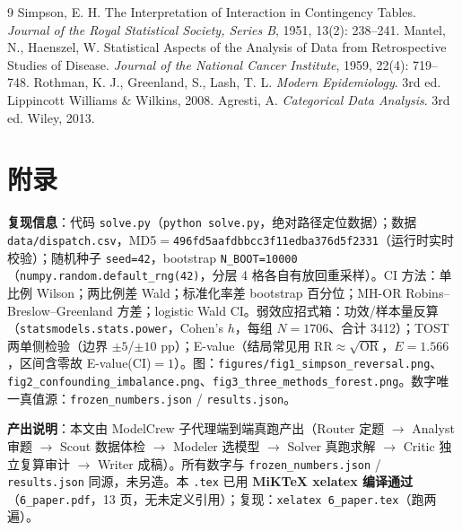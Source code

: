 \documentclass[12pt,a4paper]{ctexart}
\begin{document}
\begin{thebibliography}{9}
 Simpson, E. H. The Interpretation of Interaction in Contingency Tables. \textit{Journal of the Royal Statistical Society, Series B}, 1951, 13(2): 238--241.
 Mantel, N., Haenszel, W. Statistical Aspects of the Analysis of Data from Retrospective Studies of Disease. \textit{Journal of the National Cancer Institute}, 1959, 22(4): 719--748.
 Rothman, K. J., Greenland, S., Lash, T. L. \textit{Modern Epidemiology}. 3rd ed. Lippincott Williams \& Wilkins, 2008.
 Agresti, A. \textit{Categorical Data Analysis}. 3rd ed. Wiley, 2013.
\end{thebibliography}

\appendix
\section{附录}
\textbf{复现信息}：代码 \texttt{solve.py}（\texttt{python solve.py}，绝对路径定位数据）；数据 \texttt{data/dispatch.csv}，MD5$=$\texttt{496fd5aafdbbcc3f11edba376d5f2331}（运行时实时校验）；随机种子 \texttt{seed=42}，bootstrap \texttt{N\_BOOT=10000}（\texttt{numpy.random.default\_rng(42)}，分层 4 格各自有放回重采样）。CI 方法：单比例 Wilson；两比例差 Wald；标准化率差 bootstrap 百分位；MH-OR Robins--Breslow--Greenland 方差；logistic Wald CI。弱效应招式箱：功效/样本量反算（\texttt{statsmodels.stats.power}，Cohen's $h$，每组 $N=1706$、合计 3412）；TOST 两单侧检验（边界 $\pm5$/$\pm10$ pp）；E-value（结局常见用 RR$\approx\sqrt{\text{OR}}$，$E=1.566$，区间含零故 E-value(CI)$=1$）。图：\texttt{figures/fig1\_simpson\_reversal.png}、\texttt{fig2\_confounding\_imbalance.png}、\texttt{fig3\_three\_methods\_forest.png}。数字唯一真值源：\texttt{frozen\_numbers.json} / \texttt{results.json}。

\noindent\textbf{产出说明}：本文由 ModelCrew 子代理端到端真跑产出（Router 定题 $\to$ Analyst 审题 $\to$ Scout 数据体检 $\to$ Modeler 选模型 $\to$ Solver 真跑求解 $\to$ Critic 独立复算审计 $\to$ Writer 成稿）。所有数字与 \texttt{frozen\_numbers.json} / \texttt{results.json} 同源，未另造。本 \texttt{.tex} 已用 \textbf{MiKTeX xelatex 编译通过}（\texttt{6\_paper.pdf}，13 页，无未定义引用）；复现：\texttt{xelatex 6\_paper.tex}（跑两遍）。
\end{document}
